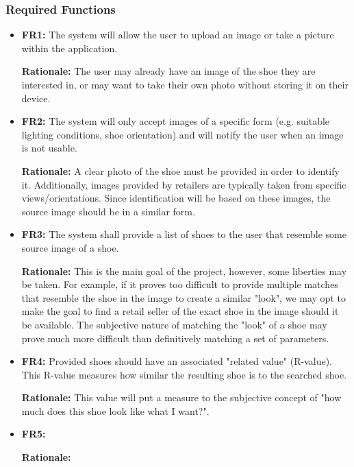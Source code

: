 \documentclass[12pt, titlepage]{article}
\begin{document}
\subsubsection{Required Functions}
\begin{itemize}
    \item 
    \textbf{FR1:} The system will allow the user to upload an image or take a picture within the application. 
    
    \textbf{Rationale:} The user may already have an image of the shoe they are interested in, or may want to take their own photo without storing it on their device.
    
    \item 
    \textbf{FR2:} The system will only accept images of a specific form (e.g. suitable lighting conditions, shoe orientation) and will notify the user when an image is not usable. 
    
    \textbf{Rationale:} A clear photo of the shoe must be provided in order to identify it. Additionally, images provided by retailers are typically taken from specific views/orientations. Since identification will be based on these images, the source image should be in a similar form.
    
    \item 
    \textbf{FR3:} The system shall provide a list of shoes to the user that resemble some source image of a shoe. 
    
    \textbf{Rationale:} This is the main goal of the project, however, some liberties may be taken. For example, if it proves too difficult to provide multiple matches that resemble the shoe in the image to create a similar "look", we may opt to make the goal to find a retail seller of the exact shoe in the image should it be available. The subjective nature of matching the "look" of a shoe may prove much more difficult than definitively matching a set of parameters.
    
    \item 
    \textbf{FR4:} Provided shoes should have an associated "related value" (R-value). This R-value measures how similar the resulting shoe is to the searched shoe. 
    
    \textbf{Rationale:} This value will put a measure to the subjective concept of "how much does this shoe look like what I want?".
    
    \item 
    \textbf{FR5:} 
    
    \textbf{Rationale:} 
\end{itemize}
\end{document}
